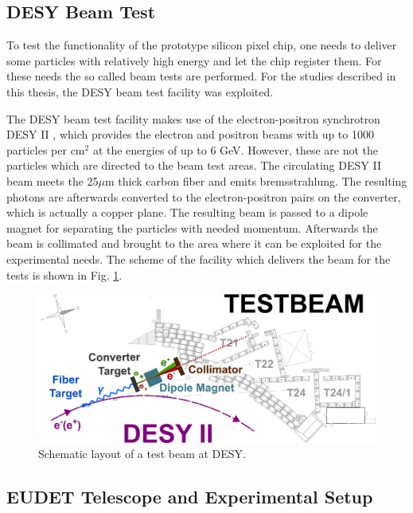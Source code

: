 \subsection{DESY Beam Test}

To test the functionality of the prototype silicon pixel chip, one needs to deliver some particles with relatively high energy and let
the chip register them. For these needs the so called beam tests are performed. For the studies described in this thesis, the DESY beam test
facility was exploited.

The DESY beam test facility makes use of the electron-positron synchrotron DESY II \cite{Hemmie:1982xq, DESYIIWeb}, which provides the electron
and positron beams with up to 1000 particles per cm$^{2}$ at the energies of up to 6 GeV. However, these are not the particles which are directed
to the beam test areas. The circulating DESY II beam meets the 25$\mu$m thick carbon fiber and emits bremsstrahlung. The resulting photons are afterwards 
converted to the electron-positron pairs on the converter, which is actually a copper plane. The resulting beam is passed to a dipole magnet for
separating the particles with needed momentum. Afterwards the beam is collimated and brought to the area where it can be exploited for the
experimental needs. The scheme of the facility which delivers the beam for the tests is shown in Fig. \ref{fig:desy_tb}.

\begin{figure}[t]
 \centering
 \includegraphics[width=1.0\textwidth]{021_pixel_upgrade/plots/desy_tb-sketch.png}
 \caption{Schematic layout of a test beam at DESY.}
 \label{fig:desy_tb}
\end{figure}

\subsection{EUDET Telescope and Experimental Setup} 

